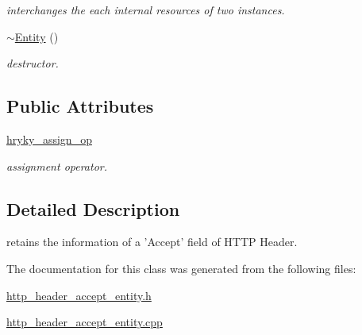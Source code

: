 \begin{DoxyCompactItemize}
\begin{DoxyCompactList}\small\item\em interchanges the each internal resources of two instances. \end{DoxyCompactList}\item 
\hypertarget{classhryky_1_1http_1_1header_1_1accept_1_1_entity_a4e9b3743fa4617838280c8a0b2755762}{\hyperlink{classhryky_1_1http_1_1header_1_1accept_1_1_entity_a4e9b3743fa4617838280c8a0b2755762}{$\sim$\-Entity} ()}\label{classhryky_1_1http_1_1header_1_1accept_1_1_entity_a4e9b3743fa4617838280c8a0b2755762}

\begin{DoxyCompactList}\small\item\em destructor. \end{DoxyCompactList}\end{DoxyCompactItemize}
\subsection*{Public Attributes}
\begin{DoxyCompactItemize}
\item 
\hypertarget{classhryky_1_1http_1_1header_1_1accept_1_1_entity_a215f93e0995f0229482c6677a3dc16b8}{\hyperlink{classhryky_1_1http_1_1header_1_1accept_1_1_entity_a215f93e0995f0229482c6677a3dc16b8}{hryky\-\_\-assign\-\_\-op}}\label{classhryky_1_1http_1_1header_1_1accept_1_1_entity_a215f93e0995f0229482c6677a3dc16b8}

\begin{DoxyCompactList}\small\item\em assignment operator. \end{DoxyCompactList}\end{DoxyCompactItemize}


\subsection{Detailed Description}
retains the information of a 'Accept' field of H\-T\-T\-P Header. 

The documentation for this class was generated from the following files\-:\begin{DoxyCompactItemize}
\item 
\hyperlink{http__header__accept__entity_8h}{http\-\_\-header\-\_\-accept\-\_\-entity.\-h}\item 
\hyperlink{http__header__accept__entity_8cpp}{http\-\_\-header\-\_\-accept\-\_\-entity.\-cpp}\end{DoxyCompactItemize}

